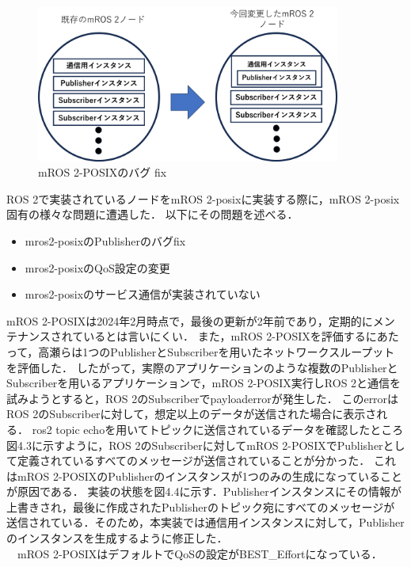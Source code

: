 \begin{figure}[h]
    \centering
    \includegraphics[width=10cm]{images/fig4_mros2bug_fix.png}
    \caption{mROS 2-POSIXのバグ fix}
    \label{fig:mros2bug-fix}
\end{figure}
ROS 2で実装されているノードをmROS 2-posixに実装する際に，mROS 2-posix固有の様々な問題に遭遇した．
以下にその問題を述べる．
\begin{itemize}
    \item mros2-posixのPublisherのバグfix
    \item mros2-posixのQoS設定の変更
    \item mros2-posixのサービス通信が実装されていない
\end{itemize}
mROS 2-POSIXは2024年2月時点で，最後の更新が2年前であり，定期的にメンテナンスされているとは言いにくい．
また，mROS 2-POSIXを評価するにあたって，高瀬らは1つのPublisherとSubscriberを用いたネットワークスループットを評価した．
したがって，実際のアプリケーションのような複数のPublisherとSubscriberを用いるアプリケーションで，mROS 2-POSIX実行しROS 2と通信を試みようとすると，ROS 2のSubscriberでpayloaderrorが発生した．
このerrorはROS 2のSubscriberに対して，想定以上のデータが送信された場合に表示される．
ros2 topic echoを用いてトピックに送信されているデータを確認したところ図4.3に示すように，ROS 2のSubscriberに対してmROS 2-POSIXでPublisherとして定義されているすべてのメッセージが送信されていることが分かった．
これはmROS 2-POSIXのPublisherのインスタンスが1つのみの生成になっていることが原因である．
実装の状態を図4.4に示す．Publisherインスタンスにその情報が上書きされ，最後に作成されたPublisherのトピック宛にすべてのメッセージが送信されている．そのため，本実装では通信用インスタンスに対して，Publisherのインスタンスを生成するように修正した．
\\　mROS 2-POSIXはデフォルトでQoSの設定がBEST\_Effortになっている．
